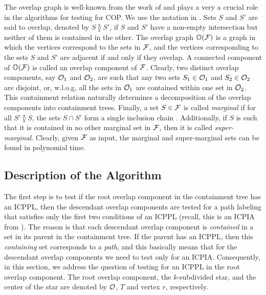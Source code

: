 \documentclass[envcountsect, envcountsame, 11pt]{../lib/llncs2e/llncs}
\def\cF{{\cal F}}
\def\cO{{\cal O}}
\def\bI{\mathbb I}
\def\bO{\mathbb O}
\def\overlap{\between}
\begin{document}
\noindent
The overlap graph is well-known from the work of
\cite{kklv10,nsnrs09,wlh02} and plays a very a crucial role in the algorithms for testing for COP.  We use the notation in
\cite{kklv10}.  Sets
$S$ and $S'$ are said to overlap, denoted by $S \overlap S'$, if $S$ and $S'$
have a non-empty intersection but neither of them is contained in the
other. 
The overlap graph $\bO(\cF)$ is a graph in which the vertices
correspond to the sets in $\cF$, and the vertices corresponding to the
sets $S$ and $S'$ are adjacent if and only if they overlap.  
A connected component of $\bO(\cF)$ is called an overlap component of
$\cF$.  Clearly, two distinct overlap components, say $\cO_1$ and $\cO_2$, are such
that any two sets $S_1 \in \cO_1$ and $S_2 \in \cO_2$ are disjoint,
or, w.l.o.g, all the sets in $\cO_1$ are contained within one set in
$\cO_2$.  This containment relation naturally determines a
decomposition of the overlap components into  containment trees.
Finally, a set $S \in \cF$ is called {\em marginal} if for all $S'
\overlap S$, the sets $S \cap S'$ form a single inclusion chain
\cite{kklv10}. Additionally, if $S$ is such that it is contained in no
other marginal set in $\cF$, then it is called {\em
  super-marginal}.  Clearly, given $\cF$ as input, the marginal and super-marginal sets can be found in polynomial time.

\subsection{Description of the Algorithm}
The first step is to test if the root overlap component in the containment tree has an ICPPL, then the descendant overlap components are 
tested for a path labeling that satisfies only the first two conditions of an ICPPL (recall, this is an ICPIA from \cite{nsnrs09}).  The reason is 
that each descendant overlap component is {\em contained} in a set in its parent in the containment tree.   If the parent has an ICPPL, then
this {\em containing} set corresponds to a {\em path}, and this basically means that for the descendant overlap components we need to test only for an ICPIA.
Consequently, in this section, we address the question of testing for an ICPPL in the root overlap component.
 The root overlap component, the $k$-subdivided star,
and the center of the star are denoted by $\cO$, $T$ and vertex $r$,
respectively.  
\end{document}
